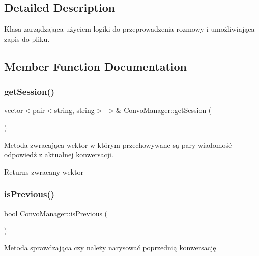 \subsection{Detailed Description}
Klasa zarządzająca użyciem logiki do przeprowadzenia rozmowy i umożliwiająca zapis do pliku. 

\subsection{Member Function Documentation}
\mbox{\label{class_convo_manager_a6297e90e7ecf3dc307005b6f14c7bd82}} 
\subsubsection{\texorpdfstring{getSession()}{getSession()}}
{\footnotesize\ttfamily vector$<$pair$<$string, string$>$ $>$\& Convo\+Manager\+::get\+Session (\begin{DoxyParamCaption}{ }\end{DoxyParamCaption})\hspace{0.3cm}{\ttfamily [inline]}}



Metoda zwracająca wektor w którym przechowywane są pary wiadomość -\/ odpowiedź z aktualnej konwersacji. 

\begin{DoxyReturn}{Returns}
zwracany wektor 
\end{DoxyReturn}
\mbox{\label{class_convo_manager_aae9ce968bce8d48be1f852eb67339306}} 
\subsubsection{\texorpdfstring{isPrevious()}{isPrevious()}}
{\footnotesize\ttfamily bool Convo\+Manager\+::is\+Previous (\begin{DoxyParamCaption}{ }\end{DoxyParamCaption})\hspace{0.3cm}{\ttfamily [inline]}}



Metoda sprawdzająca czy należy narysować poprzednią konwersację 

